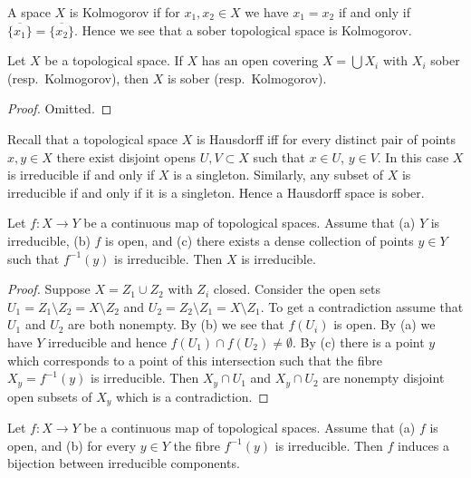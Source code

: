 \noindent
A space $X$ is Kolmogorov if for $x_1, x_2 \in X$ we have $x_1 = x_2$
if and only if $\overline{\{x_1\}} = \overline{\{x_2\}}$. Hence we see
that a sober topological space is Kolmogorov.

\begin{lemma}
\label{lemma-sober-local}
Let $X$ be a topological space. If $X$ has an open covering
$X = \bigcup X_i$ with $X_i$ sober (resp.\ Kolmogorov), then
$X$ is sober (resp.\ Kolmogorov).
\end{lemma}

\begin{proof}
Omitted.
\end{proof}

\begin{example}
\label{example-Hausdorff}
Recall that a topological space $X$ is Hausdorff iff for every
distinct pair of points $x, y \in X$ there exist disjoint
opens $U, V \subset X$ such that $x \in U$, $y \in V$.
In this case $X$ is irreducible if and only if $X$ is
a singleton. Similarly, any subset of $X$ is irreducible
if and only if it is a singleton. Hence a Hausdorff space is
sober.
\end{example}

\begin{lemma}
\label{lemma-irreducible-on-top}
Let $f : X \to Y$ be a continuous map of topological spaces.
Assume that
(a) $Y$ is irreducible,
(b) $f$ is open, and
(c) there exists a dense collection of points $y \in Y$ such
that $f^{-1}(y)$ is irreducible.
Then $X$ is irreducible.
\end{lemma}

\begin{proof}
Suppose $X = Z_1 \cup Z_2$ with $Z_i$ closed.
Consider the open sets $U_1 = Z_1 \setminus Z_2 = X \setminus Z_2$ and
$U_2 = Z_2 \setminus Z_1 = X \setminus Z_1$. To get a contradiction
assume that $U_1$ and $U_2$ are both nonempty. By (b) we see that $f(U_i)$
is open. By (a) we have $Y$ irreducible and hence
$f(U_1) \cap f(U_2) \not = \emptyset$. By (c) there is a point $y$ which
corresponds to a point of this intersection such that the fibre
$X_y = f^{-1}(y)$ is irreducible. Then $X_y \cap U_1$ and
$X_y \cap U_2$ are nonempty disjoint open subsets of $X_y$ which is
a contradiction.
\end{proof}

\begin{lemma}
\label{lemma-irreducible-fibres-irreducible-components}
Let $f : X \to Y$ be a continuous map of topological spaces.
Assume that (a) $f$ is open, and
(b) for every $y \in Y$ the fibre $f^{-1}(y)$ is irreducible.
Then $f$ induces a bijection between irreducible components.
\end{lemma}

